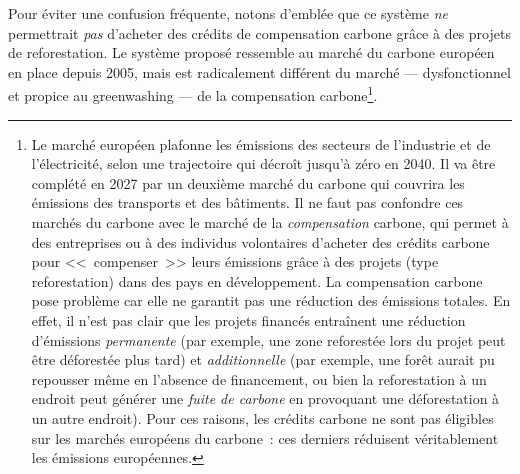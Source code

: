 \documentclass[a5paper,french,openany]{memoir}
\begin{document}
Pour éviter une confusion fréquente, notons d'emblée que ce système \textit{ne} permettrait \textit{pas} d'acheter des crédits de compensation carbone grâce à des projets de reforestation. Le système proposé ressemble au marché du carbone européen en place depuis 2005, mais est radicalement différent du marché --- dysfonctionnel et propice au greenwashing --- de la compensation carbone\footnote{Le marché européen plafonne les émissions des secteurs de l'industrie et de l'électricité, selon une trajectoire qui décroît jusqu'à zéro en 2040. Il va être complété en 2027 par un deuxième marché du carbone qui couvrira les émissions des transports et des bâtiments. Il ne faut pas confondre ces marchés du carbone avec le marché de la \textit{compensation} carbone, qui permet à des entreprises ou à des individus volontaires d'acheter des crédits carbone pour <<~compenser~>> leurs émissions grâce à des projets (type reforestation) dans des pays en développement. La compensation carbone pose problème car elle ne garantit pas une réduction des émissions totales. En effet, il n'est pas clair que les projets financés entraînent une réduction d'émissions \textit{permanente} (par exemple, une zone reforestée lors du projet peut être déforestée plus tard) et \textit{additionnelle} (par exemple, une forêt aurait pu repousser même en l'absence de financement, ou bien la reforestation à un endroit peut générer une \textit{fuite de carbone} en provoquant une déforestation à un autre endroit). Pour ces raisons, les crédits carbone ne sont pas éligibles sur les marchés européens du carbone~: ces derniers réduisent véritablement les émissions européennes.}.
\end{document}
